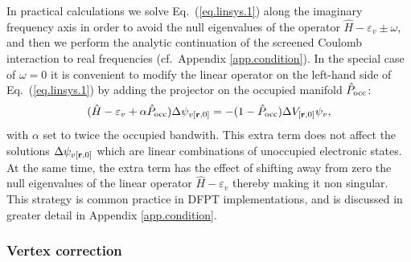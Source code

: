 \documentclass[twocolumn,prb,showpacs,superscriptaddress]{revtex4}
\def\w{\omega}
\def\H{\hat{H}}
\def\P{\hat{P}_{\rm occ}}
\def\E{\varepsilon}
\def\r{{\bf r}}
\begin{document}
In practical calculations we solve Eq.\ (\ref{eq.linsys.1}) along the imaginary
frequency axis in order to avoid the null eigenvalues of the operator
$\H-\E_v\pm\w$, and then we perform the analytic continuation of 
the screened Coulomb interaction to real frequencies (cf.\ Appendix \ref{app.condition}).
In the special case of $\w=0$ it is convenient to modify the linear operator on the left-hand side of
Eq.\ (\ref{eq.linsys.1}) by adding the projector on the occupied manifold $\P$:
 \begin{equation} \label{eq.linsys.1b}
 (\H-\E_v+\alpha\P) \Delta \psi_{v[\r,0]}  = -(1-\P)  \Delta V_{[\r,0]} \psi_v,
  \end{equation}
with $\alpha$ set to twice the occupied bandwith. This extra term does not affect
the solutions $\Delta \psi_{v[\r,0]}$ which are linear combinations
of unoccupied electronic states. At the same time, the extra term
has the effect of shifting away from zero the null eigenvalues 
of the linear operator $\H-\E_v$ thereby making it non singular.
This strategy is common practice in DFPT implementations,\cite{baroni.rmp,espresso} and
is discussed in greater detail in Appendix \ref{app.condition}.

\subsubsection{Vertex correction}\label{sec.vertex}
\end{document}
